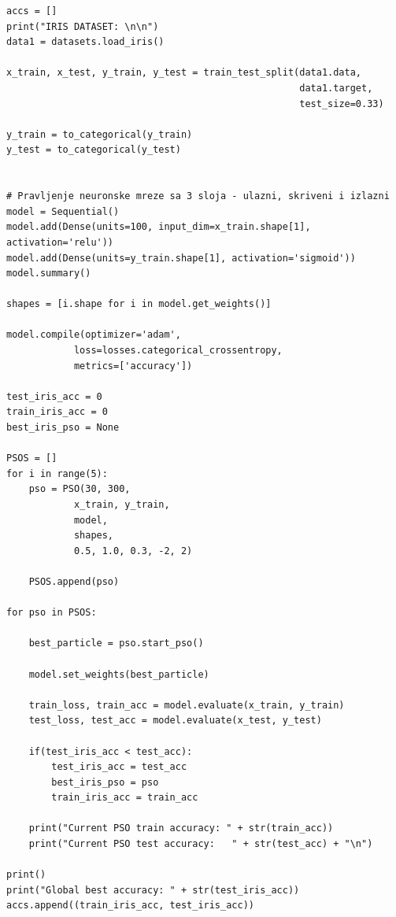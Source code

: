 \documentclass[a4paper]{article}
\begin{document}
\begin{lstlisting}
accs = []
print("IRIS DATASET: \n\n")
data1 = datasets.load_iris()

x_train, x_test, y_train, y_test = train_test_split(data1.data, 
                                                    data1.target, 
                                                    test_size=0.33)

y_train = to_categorical(y_train)
y_test = to_categorical(y_test)


# Pravljenje neuronske mreze sa 3 sloja - ulazni, skriveni i izlazni
model = Sequential()
model.add(Dense(units=100, input_dim=x_train.shape[1], activation='relu'))
model.add(Dense(units=y_train.shape[1], activation='sigmoid'))
model.summary()

shapes = [i.shape for i in model.get_weights()]

model.compile(optimizer='adam', 
            loss=losses.categorical_crossentropy, 
            metrics=['accuracy'])

test_iris_acc = 0
train_iris_acc = 0
best_iris_pso = None

PSOS = []
for i in range(5):
    pso = PSO(30, 300, 
            x_train, y_train, 
            model, 
            shapes, 
            0.5, 1.0, 0.3, -2, 2)

    PSOS.append(pso)

for pso in PSOS:

    best_particle = pso.start_pso()

    model.set_weights(best_particle)

    train_loss, train_acc = model.evaluate(x_train, y_train)
    test_loss, test_acc = model.evaluate(x_test, y_test)

    if(test_iris_acc < test_acc): 
        test_iris_acc = test_acc
        best_iris_pso = pso
        train_iris_acc = train_acc
        
    print("Current PSO train accuracy: " + str(train_acc))
    print("Current PSO test accuracy:   " + str(test_acc) + "\n")

print()
print("Global best accuracy: " + str(test_iris_acc))
accs.append((train_iris_acc, test_iris_acc))

\end{lstlisting}
\end{document}
